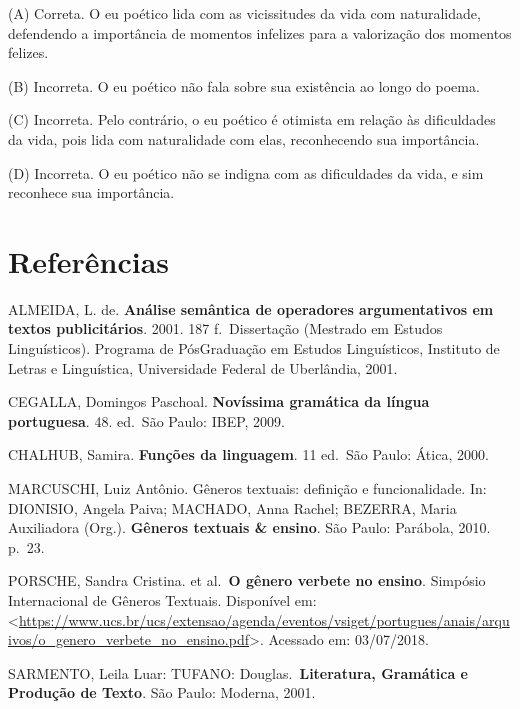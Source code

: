 (A) Correta. O eu poético lida com as vicissitudes da vida com
naturalidade, defendendo a importância de momentos infelizes para a
valorização dos momentos felizes.

(B) Incorreta. O eu poético não fala sobre sua existência ao longo do
poema.

(C) Incorreta. Pelo contrário, o eu poético é otimista em relação às
dificuldades da vida, pois lida com naturalidade com elas, reconhecendo
sua importância.

(D) Incorreta. O eu poético não se indigna com as dificuldades da vida,
e sim reconhece sua importância.

\section{Referências}

ALMEIDA, L. de. \textbf{Análise semântica de operadores argumentativos
em textos publicitários}. 2001. 187 f.~Dissertação (Mestrado em Estudos
Linguísticos). Programa de PósGraduação em Estudos Linguísticos,
Instituto de Letras e Linguística, Universidade Federal de Uberlândia,
2001.

CEGALLA, Domingos Paschoal. \textbf{Novíssima gramática da língua
portuguesa}. 48. ed.~São Paulo: IBEP, 2009.

CHALHUB, Samira. \textbf{Funções da linguagem}. 11 ed.~São Paulo: Ática,
2000.

MARCUSCHI, Luiz Antônio. Gêneros textuais: definição e funcionalidade.
In: DIONISIO, Angela Paiva; MACHADO, Anna Rachel; BEZERRA, Maria
Auxiliadora (Org.). \textbf{Gêneros textuais \& ensino}. São Paulo:
Parábola, 2010. p.~23.

PORSCHE, Sandra Cristina. et al.~\textbf{O gênero verbete no ensino}.
Simpósio Internacional de Gêneros Textuais. Disponível em:
\textless{}\url{https://www.ucs.br/ucs/extensao/agenda/eventos/vsiget/portugues/anais/arquivos/o_genero_verbete_no_ensino.pdf}\textgreater.
Acessado em: 03/07/2018.

SARMENTO, Leila Luar: TUFANO: Douglas.~\textbf{Literatura, Gramática e
Produção de Texto}. São Paulo: Moderna, 2001.
